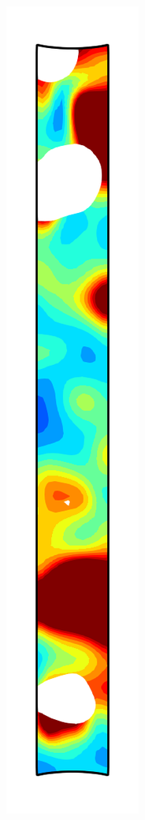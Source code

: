 \begin{figure}[!htb]
\begin{subfigure}{0.08\textwidth}
  \end{subfigure}
  \begin{subfigure}{0.08\textwidth}
    \centering
    \includegraphics[width=\textwidth]{Chapter5/figures/spallation/ep_7}

\end{subfigure}
\end{figure}
